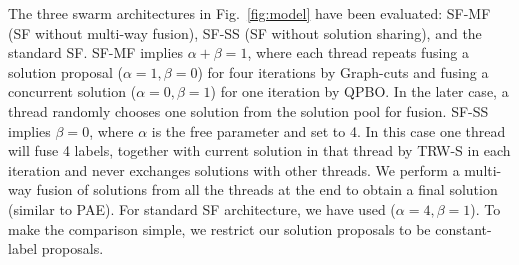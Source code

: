 \noindent The three swarm architectures in Fig.~\ref{fig:model} have
been evaluated: SF-MF (SF without multi-way fusion), SF-SS (SF without
solution sharing), and the standard SF.
%
SF-MF implies $\alpha+\beta=1$, where each thread repeats
fusing a solution proposal ($\alpha=1, \beta=0$) for four iterations
by Graph-cuts and fusing a concurrent solution  ($\alpha=0, \beta=1$)
for one iteration by QPBO.
In the later case, a thread randomly chooses one solution from the
solution pool for fusion. SF-SS implies $\beta=0$, where $\alpha$ is
the free parameter and set to 4. In this case one thread will fuse 4
labels, together with current solution in that thread by TRW-S in each
iteration and never exchanges solutions with other threads. We perform
a multi-way fusion of solutions from all the threads at the end to
obtain a final solution
(similar to PAE). For standard SF architecture, we have used
($\alpha=4, \beta=1$).  To make the comparison simple, we restrict our
solution proposals to be constant-label proposals.
%
